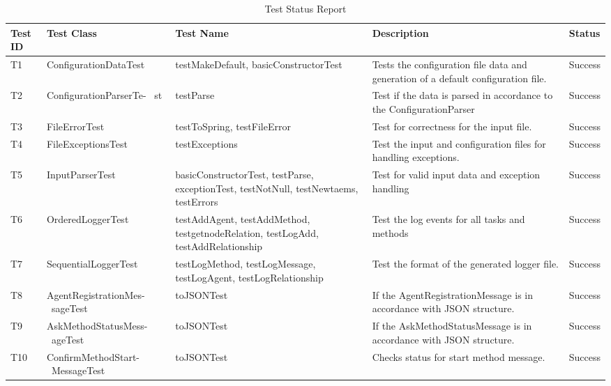 \begin{enumerate}
\begin{itemize}
\begin{table}[H]
\caption{Test Status Report} %
\begin{tabular}{| l | p{4cm} | p{4cm} | p{4cm} | l |} 
\hline\hline %
 Test ID & Test Class & Test Name &  Description & Status \\ [0.5ex] %
\hline %
T1 & ConfigurationDataTest & testMakeDefault, basicConstructorTest & Tests the configuration file data and generation of a default configuration file. & Success \\ %
T2  & ConfigurationParserTe- \ st & testParse & Test if the data is parsed in accordance to the ConfigurationParser &  Success \\ %
T3 & FileErrorTest & testToSpring, testFileError & Test for correctness for the input file. &  Success \\ %
T4 & FileExceptionsTest & testExceptions & Test the input and configuration files for handling exceptions. &  Success \\
T5 & InputParserTest & basicConstructorTest, testParse, exceptionTest, testNotNull, testNewtaems, testErrors & Test for valid input data and exception handling &  Success \\
T6 & OrderedLoggerTest & testAddAgent, testAddMethod, testgetnodeRelation, testLogAdd, testAddRelationship & Test the log events for all tasks and methods &  Success \\
T7 & SequentialLoggerTest & testLogMethod, testLogMessage, testLogAgent, testLogRelationship & Test the format of the generated logger file. &  Success \\
T8 & AgentRegistrationMes- \ sageTest & toJSONTest &  If the AgentRegistrationMessage is in accordance with JSON structure. &  Success \\
T9 & AskMethodStatusMess- \ ageTest &  toJSONTest & If the AskMethodStatusMessage is in accordance with JSON structure. &  Success \\
T10 & ConfirmMethodStart- \ MessageTest & toJSONTest & Checks status for start method message. &  Success \\

\hline %
\end{tabular} 
\label{table:nonlin} %
\end{table} 


\end{itemize}
\end{enumerate}
